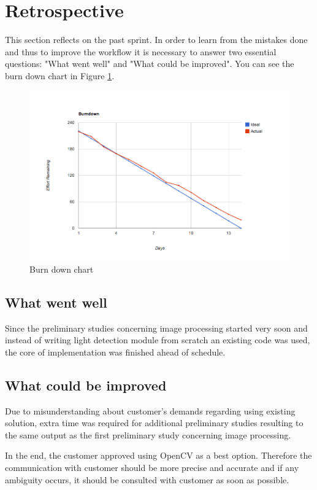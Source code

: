 \section{Retrospective}
This section reflects on the past sprint. In order to learn from the mistakes done and thus to improve the workflow it is necessary to answer two essential questions: "What went well" and "What could be improved".
You can see the burn down chart in Figure \ref{fig:Burn3}.

\begin{figure}[h]
	\centering
		\includegraphics[width=18cm]{sprint3/BurndownSprint3.png}
	\caption{Burn down chart}
	\label{fig:Burn3}
\end{figure}

\subsection{What went well}
Since the preliminary studies concerning image processing started very soon and instead of writing light detection module from scratch an existing code was used, the core of implementation was finished ahead of schedule.

\subsection{What could be improved}
Due to misunderstanding about customer's demands regarding using existing solution, extra time was required for additional preliminary studies resulting to the same output as the first preliminary study concerning image processing. 

In the end, the customer approved using OpenCV as a best option.
Therefore the communication with customer should be more precise and accurate and if any ambiguity occurs, it should be consulted with customer as soon as possible.

